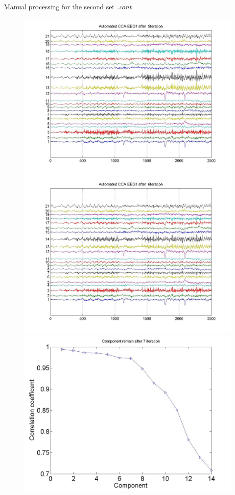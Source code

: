 \documentclass[t,12pt,english
\ifx\beamermode\undefined\else,\beamermode\fi
]{beamer}
\begin{document}
\begin{frame}{Manual processing  for the second set \textit{.cont}}
\begin{figure}[!htbp]
\includegraphics[width=1\textwidth]{22.jpg}
\endminipage\hfill
{}%
\centering
\includegraphics[width=1\textwidth]{25.jpg}\\
\includegraphics[width=1\textwidth]{26.jpg}
\endminipage\hfill
\end{figure}

 
\end{frame}  
 
\end{document}
